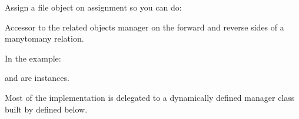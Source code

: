 \documentclass[letterpaper,10pt,english]{sphinxmanual}
\begin{document}
\begin{fulllineitems}
\begin{fulllineitems}
\sphinxAtStartPar
Assign a file object on assignment so you can do:

\begin{sphinxVerbatim}[commandchars=\\\{\}]
   
      
\end{sphinxVerbatim}

\end{fulllineitems}


\begin{fulllineitems}
\label{\detokenize{users:users.models.assignments.courses_set}}
\sphinxAtStartPar
Accessor to the related objects manager on the forward and reverse sides of
a many\sphinxhyphen{}to\sphinxhyphen{}many relation.

\sphinxAtStartPar
In the example:

\begin{sphinxVerbatim}[commandchars=\\\{\}]
 
       
\end{sphinxVerbatim}

\sphinxAtStartPar
{} and  are 
instances.

\sphinxAtStartPar
Most of the implementation is delegated to a dynamically defined manager
class built by  defined below.

\end{fulllineitems}



\end{fulllineitems}
\end{document}

